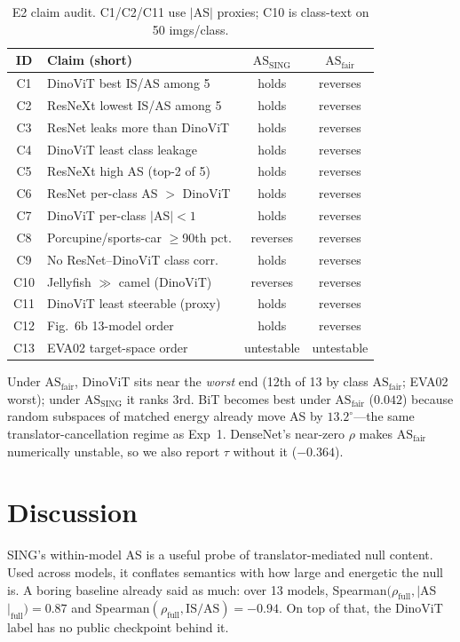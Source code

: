 \documentclass[10pt,twocolumn]{article}
\begin{document}
\begin{table}[t]
\centering
\scriptsize
\setlength{\tabcolsep}{2.5pt}
\begin{tabular}{@{}clcc@{}}
\toprule
ID & Claim (short) & $\mathrm{AS}_{\mathrm{SING}}$ & $\mathrm{AS}_{\mathrm{fair}}$ \\
\midrule
C1 & DinoViT best IS/AS among 5 & holds & reverses \\
C2 & ResNeXt lowest IS/AS among 5 & holds & reverses \\
C3 & ResNet leaks more than DinoViT & holds & reverses \\
C4 & DinoViT least class leakage & holds & reverses \\
C5 & ResNeXt high AS (top-2 of 5) & holds & reverses \\
C6 & ResNet per-class AS $>$ DinoViT & holds & reverses \\
C7 & DinoViT per-class $|$AS$|{<}1$ & holds & reverses \\
C8 & Porcupine/sports-car $\ge$90th pct. & reverses & reverses \\
C9 & No ResNet--DinoViT class corr. & holds & reverses \\
C10 & Jellyfish $\gg$ camel (DinoViT) & reverses & reverses \\
C11 & DinoViT least steerable (proxy) & holds & reverses \\
C12 & Fig.~6b 13-model order & holds & reverses \\
C13 & EVA02 target-space order & untestable & untestable \\
\bottomrule
\end{tabular}
\vspace{-0.4em}
\caption{E2 claim audit. C1/C2/C11 use $|$AS$|$ proxies; C10 is class-text on 50 imgs/class.}
\label{tab:claims}
\vspace{-0.8em}
\end{table}

Under $\mathrm{AS}_{\mathrm{fair}}$, DinoViT sits near the \emph{worst} end (12th of 13 by class $\mathrm{AS}_{\mathrm{fair}}$; EVA02 worst); under $\mathrm{AS}_{\mathrm{SING}}$ it ranks 3rd.
BiT becomes best under $\mathrm{AS}_{\mathrm{fair}}$ ($0.042$) because random subspaces of matched energy already move AS by $13.2^\circ$---the same translator-cancellation regime as Exp~1.
DenseNet's near-zero $\rho$ makes $\mathrm{AS}_{\mathrm{fair}}$ numerically unstable, so we also report $\tau$ without it (${-}0.364$).

\section{Discussion}
\vspace{-0.2em}
SING's within-model AS is a useful probe of translator-mediated null content. Used across models, it conflates semantics with how large and energetic the null is.
A boring baseline already said as much: over 13 models, Spearman$(\rho_{\mathrm{full}},|$AS$|_{\mathrm{full}}){=}0.87$ and Spearman$(\rho_{\mathrm{full}},\mathrm{IS}/\mathrm{AS}){=}{-}0.94$.
On top of that, the DinoViT label has no public checkpoint behind it.
\end{document}
